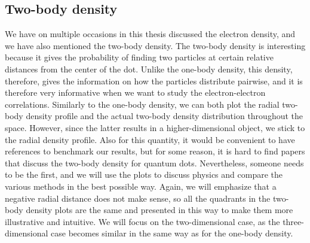 \subsection{Two-body density}
We have on multiple occasions in this thesis discussed the electron density, and we have also mentioned the two-body density. The two-body density is interesting because it gives the probability of finding two particles at certain relative distances from the center of the dot. Unlike the one-body density, this density, therefore, gives the information on how the particles distribute pairwise, and it is therefore very informative when we want to study the electron-electron correlations. Similarly to the one-body density, we can both plot the radial two-body density profile and the actual two-body density distribution throughout the space. However, since the latter results in a higher-dimensional object, we stick to the radial density profile. Also for this quantity, it would be convenient to have references to benchmark our results, but for some reason, it is hard to find papers that discuss the two-body density for quantum dots. Nevertheless, someone needs to be the first, and we will use the plots to discuss physics and compare the various methods in the best possible way. Again, we will emphasize that a negative radial distance does not make sense, so all the quadrants in the two-body density plots are the same and presented in this way to make them more illustrative and intuitive. We will focus on the two-dimensional case, as the three-dimensional case becomes similar in the same way as for the one-body density. 

